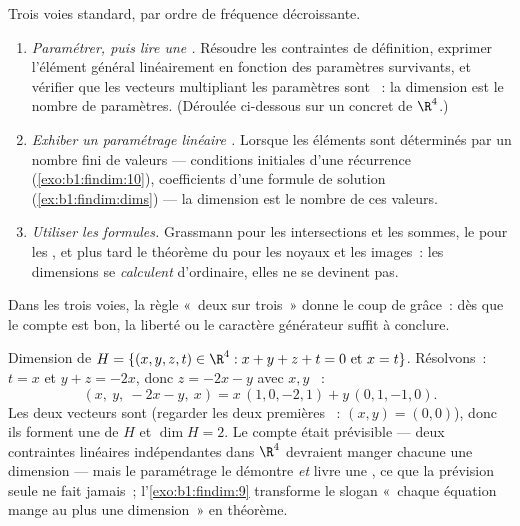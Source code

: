 \begin{method}
\label{met:b1:findim:computedim}
Trois voies standard, par ordre de fréquence décroissante.
\begin{enumerate}
  \item \emph{Paramétrer, puis lire une .} Résoudre les
        contraintes de définition, exprimer l'élément général
        linéairement en fonction des paramètres survivants, et
        vérifier que les vecteurs multipliant les paramètres sont
        ~: la dimension est le nombre de paramètres. (Déroulée
        ci-dessous sur un  concret de $\R^4$.)
  \item \emph{Exhiber un paramétrage linéaire .} Lorsque
        les éléments sont déterminés par un nombre fini de valeurs
        --- conditions initiales d'une récurrence
        (\cref{exo:b1:findim:10}), coefficients d'une formule de
        solution (\cref{ex:b1:findim:dims}) --- la dimension est le
        nombre de ces valeurs.
  \item \emph{Utiliser les formules.} Grassmann pour les
        intersections et les sommes, le  pour les , et plus tard le théorème du  pour les noyaux
        et les images~: les dimensions se \emph{calculent}
        d'ordinaire, elles ne se devinent pas.
\end{enumerate}
Dans les trois voies, la règle «~deux sur trois~» donne le coup de
grâce~: dès que le compte est bon, la liberté ou le caractère
générateur suffit à conclure.
\end{method}

\begin{example}
\label{ex:b1:findim:parametrize}
Dimension de $H = \{(x, y, z, t) \in \R^4 : x + y + z + t = 0
\text{ et } x = t\}$. Résolvons~: $t = x$ et $y + z = -2x$, donc $z =
-2x - y$ avec $x, y$ ~:
\[
(x,\ y,\ -2x - y,\ x) = x\,(1, 0, -2, 1) + y\,(0, 1, -1, 0) .
\]
Les deux vecteurs sont  (regarder les deux premières
~: $(x, y) = (0,0)$), donc ils forment une  de $H$ et
$\dim H = 2$. Le compte était prévisible --- deux contraintes
linéaires indépendantes dans $\R^4$ devraient manger chacune une
dimension --- mais le paramétrage le démontre \emph{et} livre une
, ce que la prévision seule ne fait jamais~;
l'\cref{exo:b1:findim:9} transforme le slogan «~chaque équation mange
au plus une dimension~» en théorème.
\end{example}

